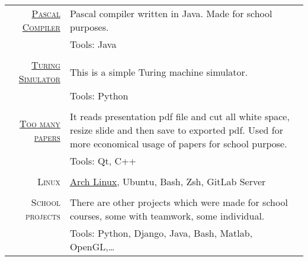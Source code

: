 \documentclass[a4paper,10pt]{article} %
\begin{document}
\begin{tabular}{rp{10cm}}
\href{https://github.com/majcn/pascalCompiler}{\textsc{Pascal Compiler}} & Pascal compiler written in Java. Made for school purposes. \\
& \footnotesize{Tools: Java} \\
\\

\href{https://github.com/majcn/TuringSimulator}{\textsc{Turing Simulator}} & This is a simple Turing machine simulator. \\
& \footnotesize{Tools: Python} \\
\\

\href{https://github.com/majcn/VarcneProsojnice}{\textsc{Too many papers}} & It reads presentation pdf file and cut all white space, resize slide and then save to exported pdf. Used for more economical usage of papers for school purpose. \\
& \footnotesize{Tools: Qt, C++} \\
\\

\textsc{Linux} & \href{https://github.com/majcn/MyArchLinux}{Arch Linux}, Ubuntu, Bash, Zsh, GitLab Server \\
\\

\textsc{School projects} & There are other projects which were made for school courses, some with teamwork, some individual. \\
& \footnotesize{Tools: Python, Django, Java, Bash, Matlab, OpenGL,\dots} 

\end{tabular}
\end{document}
